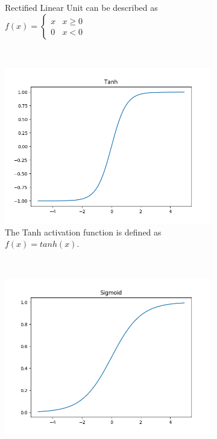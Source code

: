 \begin{figure}[h!]
\begin{subfigure}[t]{0.4\textwidth}
		\caption{Rectified Linear Unit can be described as $f(x) = \begin{cases} x & x \geq 0 \\ 0 & x < 0 \end{cases}$}
	\end{subfigure}
	~
	\begin{subfigure}[t]{0.4\textwidth}
		\centering
		\includegraphics[width=\textwidth]{img/methodology_neuralNetwork_activationFunction_tanh.png}
		\caption{The Tanh activation function is defined as $f(x) = tanh(x)$.}
	\end{subfigure}%
	~ 
	\begin{subfigure}[t]{0.4\textwidth}
		\centering
		\includegraphics[width=\textwidth]{img/methodology_neuralNetwork_activationFunction_sigmoid.png}

\end{subfigure}
\end{figure}
